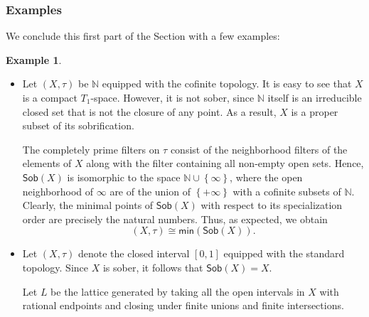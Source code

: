 \documentclass{article}
\theoremstyle{plain}
\theoremstyle{definition}
\newtheorem{example}[theorem]{Example}
\theoremstyle{remark}
\newcommand{\bool}[1]{\mathsf{#1}}
\newcommand{\bp}[1]{\left\lbrace #1 \right\rbrace}
\newcommand{\0}{\mathbbm 0}
\newcommand{\1}{\mathbbm 1}
\newcommand{\2}{\mathbbm 2}
\begin{document}
\subsubsection{Examples}
We conclude this first part of the Section with a few examples:
\begin{example} \( \)
    \label{ex:sober}\begin{itemize}
        \item    Let \((X,\tau)\) be \(\mathbb{N}\) equipped with the cofinite topology. It is easy to see that \(X\) is a compact \(T_1\)-space. However, it is not sober, since \(\mathbb{N}\) itself is an irreducible closed set that is not the closure of any point. As a result, \(X\) is a proper subset of its sobrification. 

The completely prime filters on \(\tau\) consist of the neighborhood filters of the elements of \(X\) along with the filter containing all non-empty open sets. Hence, \(\bool{Sob}(X)\) is isomorphic to the space \(\mathbb{N} \cup \bp{\infty}\), where the open neighborhood of \(\infty\) are of the union of \(\bp{+\infty}\) with a cofinite subsets of \(\mathbb{N}\).
Clearly, the minimal points of \(\bool{Sob}(X)\) with respect to its specialization order are precisely the natural numbers. Thus, as expected, we obtain  
\[
(X,\tau) \cong \bool{min}(\bool{Sob}(X)).
\]
\item \label{ex:stone} 

Let \((X, \tau)\) denote the closed interval \([0,1]\) equipped with the standard topology. Since \(X\) is sober, it follows that \(\bool{Sob}(X) = X\). 

Let \(L\) be the lattice generated by taking all the open intervals in \(X\) with rational endpoints and closing under finite unions and finite intersections. 


\end{itemize}
\end{example}
\end{document}
